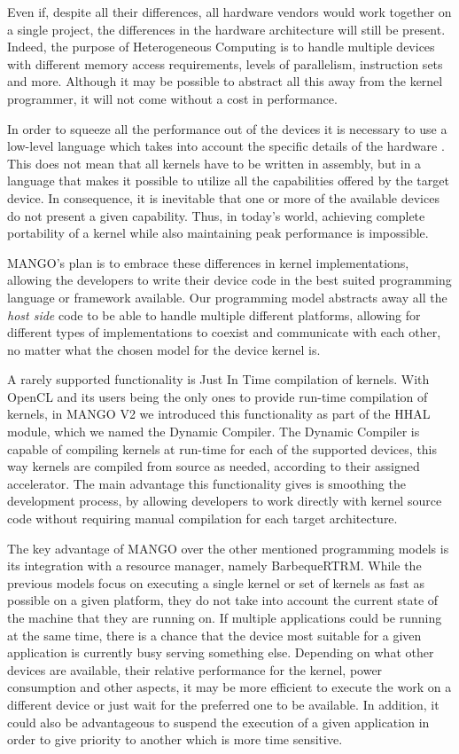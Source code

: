 Even if, despite all their differences, all hardware vendors would work together on a single project, the differences in the hardware architecture will still be present. Indeed, the purpose of Heterogeneous Computing is to handle multiple devices with different memory access requirements, levels of parallelism, instruction sets and more. Although it may be possible to abstract all this away from the kernel programmer, it will not come without a cost in performance.

In order to squeeze all the performance out of the devices it is necessary to use a low-level language which takes into account the specific details of the hardware \cite{cuda_open_source_compiler}. This does not mean that all kernels have to be written in assembly, but in a language that makes it possible to utilize all the capabilities offered by the target device. In consequence, it is inevitable that one or more of the available devices do not present a given capability. Thus, in today's world, achieving complete portability of a kernel while also maintaining peak performance is impossible.

MANGO's plan is to embrace these differences in kernel implementations, allowing the developers to write their device code in the best suited programming language or framework available. Our programming model abstracts away all the \textit{host side} code to be able to handle multiple different platforms, allowing for different types of implementations to coexist and communicate with each other, no matter what the chosen model for the device kernel is.

A rarely supported functionality is Just In Time compilation of kernels. With OpenCL and its users being the only ones to provide run-time compilation of kernels, in MANGO V2 we introduced this functionality as part of the HHAL module, which we named the Dynamic Compiler. The Dynamic Compiler is capable of compiling kernels at run-time for each of the supported devices, this way kernels are compiled from source as needed, according to their assigned accelerator.
The main advantage this functionality gives is smoothing the development process, by allowing developers to work directly with kernel source code without requiring manual compilation for each target architecture.

The key advantage of MANGO over the other mentioned programming models is its integration with a resource manager, namely BarbequeRTRM. While the previous models focus on executing a single kernel or set of kernels as fast as possible on a given platform, they do not take into account the current state of the machine that they are running on. If multiple applications could be running at the same time, there is a chance that the device most suitable for a given application is currently busy serving something else. Depending on what other devices are available, their relative performance for the kernel, power consumption and other aspects, it may be more efficient to execute the work on a different device or just wait for the preferred one to be available. In addition, it could also be advantageous to suspend the execution of a given application in order to give priority to another which is more time sensitive.


